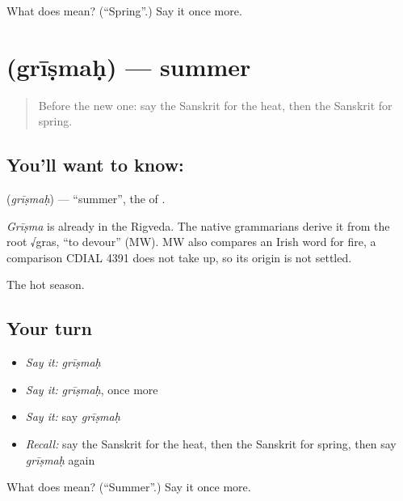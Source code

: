 \begin{tcolorbox}[breakable,colback=teal!4,colframe=teal!35!black,title={Before you move on}]
What does  mean? (\textquotedblleft{}Spring\textquotedblright{}.) Say it once more.
\end{tcolorbox}
\section[\texorpdfstring{\sk{ग्रीष्मः} (grīṣmaḥ)}{ग्रीष्मः (grīṣmaḥ)}]{ (grīṣmaḥ) — summer}

\label{lesson:SA-C76-summer}



\begin{quote}
Before the new one: say the Sanskrit for the heat, then the Sanskrit for spring.
\end{quote}

\subsection*{You'll want to know: }
\textbf{} (\emph{grīṣmaḥ}) — \textquotedblleft{}summer\textquotedblright{}, the \textbf{} of \textbf{}.

\begin{cousinweb}
\emph{Grīṣma} is already in the Rigveda. The native grammarians derive it from the root √gras, \textquotedblleft{}to devour\textquotedblright{} (MW). MW also compares an Irish word for fire, a comparison CDIAL 4391 does not take up, so its origin is not settled.
\end{cousinweb}

\begin{grammarlens}[title={What you've built}]
The hot season.
\end{grammarlens}

\subsection*{Your turn}
\begin{itemize}
\raggedright
  \item \emph{Say it:} \emph{grīṣmaḥ}
  \item \emph{Say it:} \emph{grīṣmaḥ}, once more
  \item \emph{Say it:} say \emph{grīṣmaḥ}
  \item \emph{Recall:} say the Sanskrit for the heat, then the Sanskrit for spring, then say \emph{grīṣmaḥ} again
\end{itemize}

\begin{tcolorbox}[breakable,colback=teal!4,colframe=teal!35!black,title={Before you move on}]
What does  mean? (\textquotedblleft{}Summer\textquotedblright{}.) Say it once more.
\end{tcolorbox}
